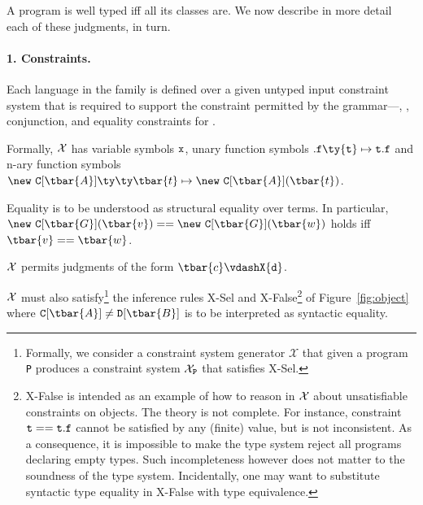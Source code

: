 A program is well typed iff all its classes are. We now describe in more detail each of these judgments, in turn. 


\paragraph{1. Constraints.}
Each language in the  family is defined over a given untyped input constraint system that is required to support the constraint permitted by the  grammar---\true{}, \false{}, conjunction, and equality constraints for \FXGL{\cdot}.

Formally, $\cal X$ %
has variable symbols $\tt x$, unary function symbols $.{\tt f}\ty{\tt t}\mapsto{\tt t}.{\tt f}$ and n-ary function symbols $\new~{\tt C}[\tbar{A}]\ty\ty\tbar{t}\mapsto\new~{\tt C}[\tbar{A}](\tbar{t})$.

Equality is to be understood as structural equality over terms. In particular, $\new~{\tt C}[\tbar{G}](\tbar{v})==\new~{\tt C}[\tbar{G}](\tbar{w})$ holds iff $\tbar{v}==\tbar{w}$.

$\cal X$ permits judgments of the form $\tbar{c} \vdashX {\tt d}$.

$\cal X$ must also satisfy\footnote{Formally, we consider a constraint system generator $\mathcal{X}$ that given a program {\tt P} produces a constraint system $\mathcal{X}_{\tt P}$ that satisfies {\sc X-Sel}.} the inference rules {\sc X-Sel} and {\sc X-False}\footnote{{\sc X-False} is intended as an example of how to reason in $\cal X$ about unsatisfiable constraints on objects. The theory is not complete. For instance, constraint ${\tt t}=={\tt t}.{\tt f}$ cannot be satisfied by any (finite) value, but is not inconsistent. As a consequence, it is impossible to make the type system reject all programs declaring empty types. Such incompleteness however does not matter to the soundness of the type system. Incidentally, one may want to substitute syntactic type equality in {\sc X-False} with type equivalence.} of Figure~\ref{fig:object}  
where ${\tt C}[\tbar{A}]\neq {\tt D}[\tbar{B}]$ is to be interpreted as syntactic equality.

